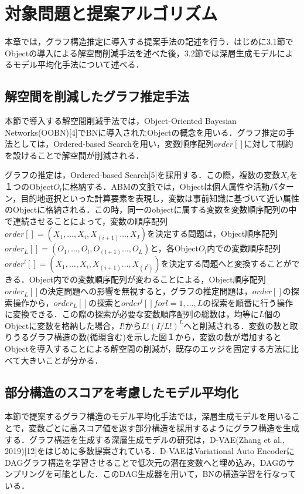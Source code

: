 \chapter{対象問題と提案アルゴリズム}
\label{3}
本章では，グラフ構造推定に導入する提案手法の記述を行う．はじめに3.1節でObjectの導入による解空間削減手法を述べた後，3.2節では深層生成モデルによるモデル平均化手法について述べる．

\section{解空間を削減したグラフ推定手法}
\label{3.1}
本節で導入する解空間削減手法では，Object-Oriented Bayesian Networks(OOBN)[4]でBNに導入されたObjectの概念を用いる．グラフ推定の手法としては，Ordered-based Searchを用い，変数順序配列$order[]$に対して制約を設けることで解空間が削減される．

グラフの推定は，Ordered-based Search[5]を採用する．この際，複数の変数$X_i$を１つのObject$O_l$に格納する．ABMの文脈では，Objectは個人属性や活動パターン，目的地選択といった計算要素を表現し，変数は事前知識に基づいて近い属性のObjectに格納される．この時，同一のobjectに属する変数を変数順序配列の中で連続させることによって，変数の順序配列$order[]=(X_1,…, X_i,X_(i+1)…,X_I )$を決定する問題は，Object順序配列$order_L []=(O_1,…, O_l,O_(l+1)…,O_L)$と，各Object$O_l$内での変数順序配列$order^l []=(X_1,…, X_i,X_(i+1)…,X_(I^l ))$を決定する問題へと変換することができる．Object内での変数順序配列が変わることによる，Object順序配列$order_L []$の決定問題への影響を無視すると，グラフの推定問題は，$order[]$の探索操作から，$order_L []$の探索と$order^l [] for l=1,…,L$の探索を順番に行う操作に変換できる．この際の探索が必要な変数順序配列の総数は，均等に$L$個のObjectに変数を格納した場合，$I!$から$L!(I/L !)^L$へと削減される．変数の数と取りうるグラフ構造の数(循環含む)を示した図１から，変数の数が増加するとObjectを導入することによる解空間の削減が，既存のエッジを固定する方法に比べて大きいことが分かる．

\section{部分構造のスコアを考慮したモデル平均化}
本節で提案するグラフ構造のモデル平均化手法では，深層生成モデルを用いることで，変数ごとに高スコア値を返す部分構造を採用するようにグラフ構造を生成する．グラフ構造を生成する深層生成モデルの研究は，D-VAE(Zhang et al., 2019)[12]をはじめに多数提案されている．D-VAEはVariational Auto EncoderにDAGグラフ構造を学習させることで低次元の潜在変数へと埋め込み，DAGのサンプリングを可能とした．このDAG生成器を用いて，BNの構造学習を行なっている．

